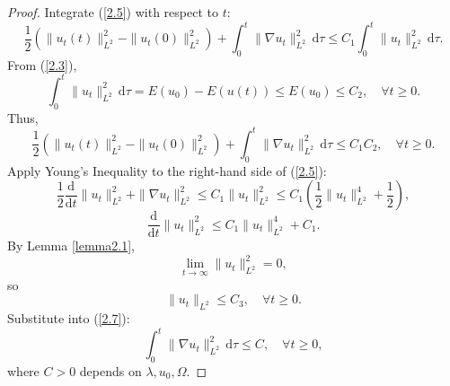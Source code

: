 \documentclass{article}
\numberwithin{equation}{section}
\begin{document}
\begin{proof}
Integrate (\ref{2.5}) with respect to $t$:
$$\frac{1}{2}(\|u_t(t)\|_{L^2}^2-\|u_t(0)\|_{L^2}^2)+\int_{0}^{t}\|\nabla u_t\|_{L^2}^2\,\mathrm{d}\tau\le C_1\int_{0}^{t}\|u_t\|_{L^2}^2\,\mathrm{d}\tau.$$
From (\ref{2.3}),
\begin{equation}
    \int_{0}^{t}\|u_t\|_{L^2}^{2}\,\mathrm{d}\tau=E(u_0)-E(u(t))\le E(u_0)\le C_2,\quad \forall t\ge 0.\label{2.6}
\end{equation}
Thus,
\begin{equation}
    \frac{1}{2}(\|u_t(t)\|_{L^2}^2-\|u_t(0)\|_{L^2}^2)+\int_{0}^{t}\|\nabla u_t\|_{L^2}^2\,\mathrm{d}\tau\le C_1C_2,\quad \forall t\ge 0.\label{2.7}
\end{equation}
Apply Young's Inequality to the right-hand side of (\ref{2.5}):
$$\frac{1}{2}\frac{\mathrm{d}}{\mathrm{d}t}\|u_t\|_{L^2}^2+\|\nabla u_t\|_{L^2}^2\le C_1\|u_t\|_{L^2}^{2}\le C_1\left(\frac{1}{2}\|u_t\|_{L^2}^{4}+\frac{1}{2}\right),$$
$$\frac{\mathrm{d}}{\mathrm{d}t}\|u_t\|_{L^2}^2\le C_1\|u_t\|_{L^2}^{4}+C_1.$$
By Lemma \ref{lemma2.1},
$$\lim_{t \to \infty}\|u_t\|_{L^2}^2=0,$$
so
$$\|u_t\|_{L^2}\le C_3,\quad \forall t\ge 0.$$
Substitute into (\ref{2.7}):
\begin{equation}
    \int_{0}^{t}\|\nabla u_t\|_{L^2}^2\,\mathrm{d}\tau\le C,\quad \forall t\ge 0,\label{2.8}
\end{equation}
where $C>0$ depends on $\lambda,u_0,\Omega$.


\end{proof}
\end{document}
